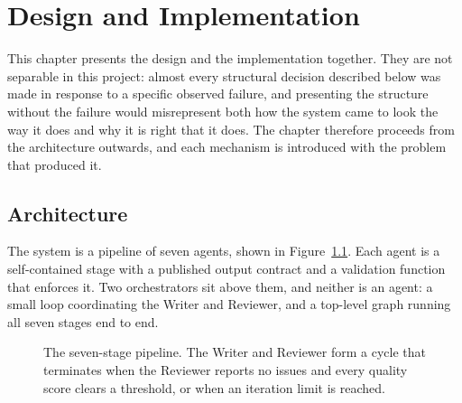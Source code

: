 \chapter{Design and Implementation}
\label{ch:design}


This chapter presents the design and the implementation together. They are not
separable in this project: almost every structural decision described below was made in
response to a specific observed failure, and presenting the structure without the failure
would misrepresent both how the system came to look the way it does and why it is right that
it does. The chapter therefore proceeds from the architecture outwards, and each mechanism is
introduced with the problem that produced it.

\section{Architecture}
\label{sec:architecture}

The system is a pipeline of seven agents, shown in Figure~\ref{fig:architecture}. Each agent
is a self-contained stage with a published output contract and a validation function that
enforces it. Two orchestrators sit above them, and neither is an agent: a small loop
coordinating the Writer and Reviewer, and a top-level graph running all seven stages
end to end.

\begin{figure}[htbp]
\centering
{}
\caption{The seven-stage pipeline. The Writer and Reviewer form a cycle that terminates
when the Reviewer reports no issues and every quality score clears a threshold, or when an
iteration limit is reached.}
\label{fig:architecture}
\end{figure}


